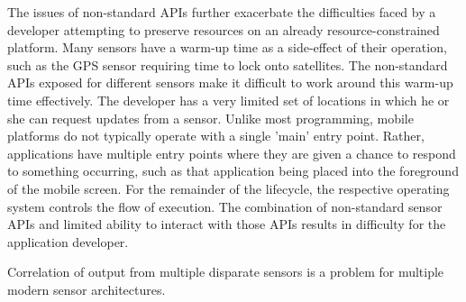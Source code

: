 \documentclass[11pt]{article}
\begin{document}
The issues of non-standard APIs further exacerbate the difficulties faced by a developer attempting to preserve resources on an already resource-constrained platform. Many sensors have a warm-up time as a side-effect of their operation, such as the GPS sensor requiring time to lock onto satellites. The non-standard APIs exposed for different sensors make it difficult to work around this warm-up time effectively. The developer has a very limited set of locations in which he or she can request updates from a sensor. Unlike most programming, mobile platforms do not typically operate with a single 'main' entry point. Rather, applications have multiple entry points where they are given a chance to respond to something occurring, such as that application being placed into the foreground of the mobile screen. For the remainder of the lifecycle, the respective operating system controls the flow of execution. The combination of non-standard sensor APIs and limited ability to interact with those APIs results in difficulty for the application developer. %

Correlation of output from multiple disparate sensors is a problem for multiple modern sensor architectures. 
\end{document}
